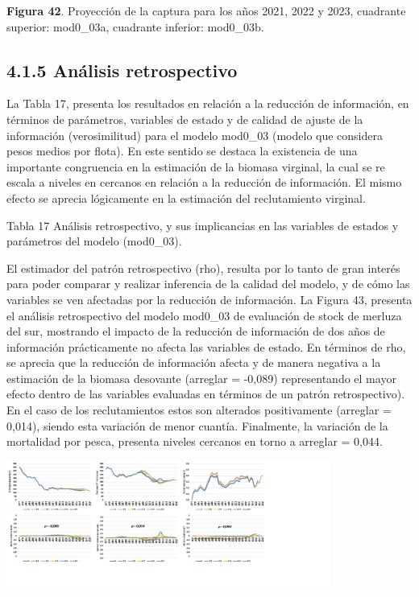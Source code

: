\documentclass[
  spanish,
]{article}
\begin{document}
\small \textbf{Figura 42}. Proyección de la captura para los años 2021,
2022 y 2023, cuadrante superior: mod0\_03a, cuadrante inferior:
mod0\_03b. \vspace{0.5cm} \normalsize

\hypertarget{anuxe1lisis-retrospectivo-1}{%
\subsection{4.1.5 Análisis
retrospectivo}\label{anuxe1lisis-retrospectivo-1}}

La Tabla 17, presenta los resultados en relación a la reducción de
información, en términos de parámetros, variables de estado y de calidad
de ajuste de la información (verosimilitud) para el modelo mod0\_03
(modelo que considera pesos medios por flota). En este sentido se
destaca la existencia de una importante congruencia en la estimación de
la biomasa virginal, la cual se re escala a niveles en cercanos en
relación a la reducción de información. El mismo efecto se aprecia
lógicamente en la estimación del reclutamiento virginal.

Tabla 17 Análisis retrospectivo, y sus implicancias en las variables de
estados y parámetros del modelo (mod0\_03).

El estimador del patrón retrospectivo (rho), resulta por lo tanto de
gran interés para poder comparar y realizar inferencia de la calidad del
modelo, y de cómo las variables se ven afectadas por la reducción de
información. La Figura 43, presenta el análisis retrospectivo del modelo
mod0\_03 de evaluación de stock de merluza del sur, mostrando el impacto
de la reducción de información de dos años de información prácticamente
no afecta las variables de estado. En términos de rho, se aprecia que la
reducción de información afecta y de manera negativa a la estimación de
la biomasa desovante (arreglar = -0,089) representando el mayor efecto
dentro de las variables evaluadas en términos de un patrón
retrospectivo). En el caso de los reclutamientos estos son alterados
positivamente (arreglar = 0,014), siendo esta variación de menor
cuantía. Finalmente, la variación de la mortalidad por pesca, presenta
niveles cercanos en torno a arreglar = 0,044.

\begin{center}
\includegraphics[width=0.8\textwidth]{Figuras/Figura_43.png}
\end{center}
\end{document}
